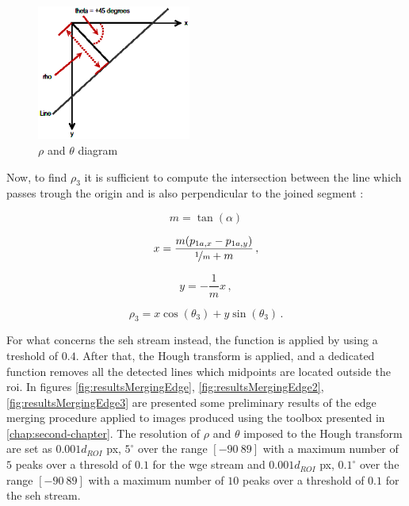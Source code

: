 \begin{figure}[htbp]
  \centering
  \includegraphics[width=0.45\textwidth]{gfx/hough_rho_theta_diagram.eps}
  \caption{$\rho$ and $\theta$ diagram}
  \label{fig:theposeproblem}
\end{figure}

Now, to find $\rho_3$ it is sufficient to compute the intersection between the line which passes trough the origin and is also perpendicular to the joined segment :

\begin{equation}
  m = \tan(\alpha)
\end{equation}

\begin{equation}
  x = \frac{m(p_{1a,x}-p_{1a,y})}{\nicefrac{1}{m} + m} \,,
\end{equation}

\begin{equation}
  y = - \frac{1}{m} x \,,
\end{equation}

\begin{equation}
  \rho_3 = x \cos (\theta_3) +  y \sin (\theta_3) \,.
\end{equation}

For what concerns the \acrshort{seh} stream instead, the  function is applied by using a treshold of $0.4$. After that, the Hough transform is applied, and a dedicated function removes all the detected lines which midpoints are located outside the \acrshort{roi}.
In figures \ref{fig:resultsMergingEdge}, \ref{fig:resultsMergingEdge2}, \ref{fig:resultsMergingEdge3} are presented some preliminary results of the edge merging procedure applied to images produced using the toolbox presented in \ref{chap:second-chapter}. The resolution of $\rho$ and $\theta$ imposed to the Hough transform are set as $0.001 d_{ROI}$ px, $5^\circ$ over the range $[-90 \ 89]$ with a maximum number of $5$ peaks over a thresold of $0.1$ for the \acrshort{wge} stream and $0.001 d_{ROI}$ px, $0.1^\circ$ over the range $[-90 \ 89]$ with a maximum number of $10$ peaks over a threshold of $0.1$ for the \acrshort{seh} stream.


